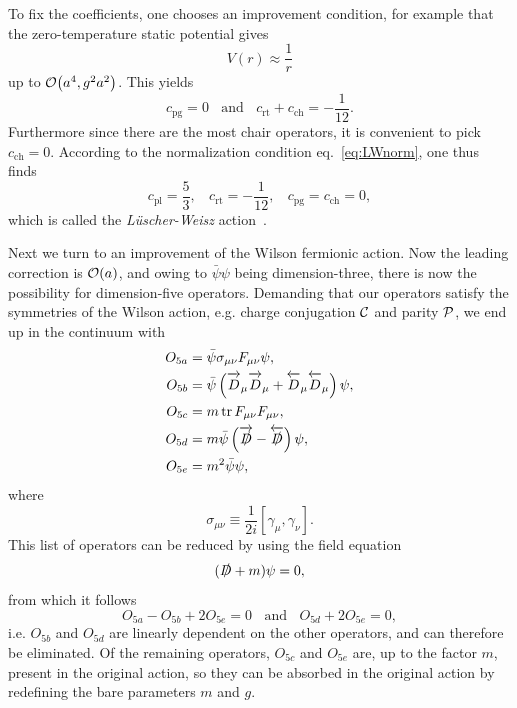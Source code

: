 To fix the coefficients, one chooses an improvement condition, for example
that the zero-temperature static potential gives
\begin{equation}
  V(r)\approx\frac{1}{r}
\end{equation}
up to $\order{a^4,g^2a^2}$. This yields 
\begin{equation}
  c_\text{pg}=0~~~~\text{and}~~~~c_\text{rt}+c_\text{ch}=-\frac{1}{12}.
\end{equation}
Furthermore since there are the most chair operators, it is convenient
to pick $c_\text{ch}=0$. According to the normalization condition
eq.~\eqref{eq:LWnorm}, one thus finds
\begin{equation}
  c_\text{pl}=\frac{5}{3},~~~~c_\text{rt}=-\frac{1}{12},~~~~
    c_\text{pg}=c_\text{ch}=0,
\end{equation}
which is called the {\it L\"uscher-Weisz} action~\cite{luscher_shell_1985}.

Next we turn to an improvement of the Wilson fermionic action. Now the leading
correction is $\order{a}$, and owing to $\bar{\psi}\psi$ being dimension-three,
there is now the possibility for dimension-five operators. Demanding that
our operators satisfy the symmetries of the Wilson action, e.g.
charge conjugation $\mathcal{C}$ and parity $\mathcal{P}$, we end up in the
continuum with 
\begin{equation}\begin{aligned}
  O_{5a}&=\bar\psi \sigma_{\mu\nu}F_{\mu\nu}\psi, \\
  O_{5b}&=\bar\psi\left(\overrightarrow{D\strut}_\mu\overrightarrow{D\strut}_\mu
                          +\overleftarrow{D\strut}_\mu\overleftarrow{D\strut}_\mu\right)\psi,\\ 
  O_{5c}&=m \tr F_{\mu\nu}F_{\mu\nu},\\
  O_{5d}&=m\bar\psi\left(\overrightarrow{\slashed{D}\strut}
                         -\overleftarrow{\slashed{D}\strut}\right)\psi,\\
  O_{5e}&=m^2 \bar\psi \psi,
\end{aligned}\end{equation}
where
\begin{equation}
  \sigma_{\mu\nu}\equiv\frac{1}{2i}[\gamma_\mu,\gamma_\nu].
\end{equation}
This list of operators can be reduced by using the field equation
\begin{equation}
 (\slashed{D}+m)\psi=0,
\end{equation}
from which it follows
\begin{equation}
  O_{5a}-O_{5b}+2O_{5e}=0~~~~\text{and}~~~~O_{5d}+2O_{5e}=0,
\end{equation}
i.e. $O_{5b}$ and $O_{5d}$ are linearly dependent on the other operators,
and can therefore be eliminated. Of the remaining operators, $O_{5c}$ and
$O_{5e}$ are, up to the factor $m$, present in the original action, so
they can be absorbed in the original action by redefining the bare
parameters $m$ and $g$.

